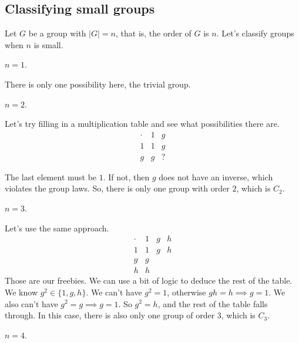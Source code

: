 \subsection{Classifying small groups}

Let $G$ be a group with $\vert G\vert = n$, that is, the \ac{order} of $G$ is $n$. Let's classify groups when $n$ is small. 

\begin{example}
\exlabel

$n=1$.
\end{example}

There is only one possibility here, the trivial group. 

\begin{example}
\exlabel

$n=2$.
\end{example}

Let's try filling in a multiplication table and see what possibilities there are. 
\[\begin{array}{c|cc}
     \cdot & 1&g \\
     \hline
     1&1&g \\
     g&g&? 
\end{array}\]

The last element must be $1$. If not, then $g$ does not have an inverse, which violates the group laws. So, there is only one group with order $2$, which is $C_2$. 

\begin{example}
\exlabel

$n=3$. 
\end{example}

Let's use the same approach. 
\[\begin{array}{c|ccc}
     \cdot & 1&g&h \\
     \hline
     1&1&g&h \\
     g&g&& \\
     h&h&&
\end{array}\]
Those are our freebies. We can use a bit of logic to deduce the rest of the table. We know $g^2\in \{1,g,h\}$. We can't have $g^2=1$, otherwise $gh=h\implies g=1$. We also can't have $g^2=g\implies g=1$. So $g^2=h$, and the rest of the table falls through. In this case, there is also only one group of order $3$, which is $C_3$. 

\begin{example}
\exlabel

$n=4$. 
\end{example}

